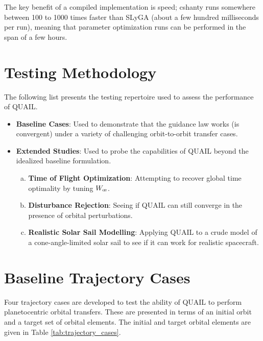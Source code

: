The key benefit of a compiled implementation is speed; cshanty runs somewhere between 100 to 1000 times faster than SLyGA (about a few hundred milliseconds per run), meaning that parameter optimization runs can be performed in the span of a few hours.

\section{Testing Methodology}
The following list presents the testing repertoire used to assess the performance of QUAIL.

\begin{itemize}
  \item\textbf{Baseline Cases}: Used to demonstrate that the guidance law works (is convergent) under a variety of challenging orbit-to-orbit transfer cases.
  \item\textbf{Extended Studies}: Used to probe the capabilities of QUAIL beyond the idealized baseline formulation.
        \begin{enumerate}[(a)]
          \item\textbf{Time of Flight Optimization}: Attempting to recover global time optimality by tuning \(W_\moe\).
          \item\textbf{Disturbance Rejection}: Seeing if QUAIL can still converge in the presence of orbital perturbations.
          \item\textbf{Realistic Solar Sail Modelling}: Applying QUAIL to a crude model of a cone-angle-limited solar sail to see if it can work for realistic spacecraft.
        \end{enumerate}
\end{itemize}

\section{Baseline Trajectory Cases}
Four trajectory cases are developed to test the ability of QUAIL to perform planetocentric orbital transfers. These are presented in terms of an initial orbit and a target set of orbital elements. The initial and target orbital elements are given in Table \ref{tab:trajectory_cases}.


